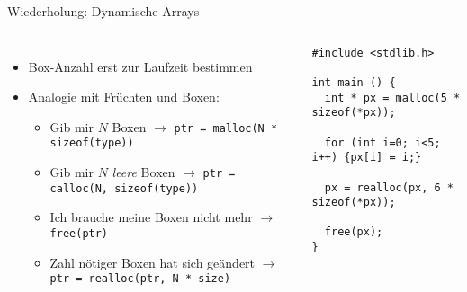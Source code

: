 \begin{frame}[fragile]{Wiederholung: Dynamische Arrays}
%
\begin{columns}[T]
\begin{itemize}
\item Box-Anzahl erst zur Laufzeit bestimmen
\item Analogie mit Früchten und Boxen:
	\begin{itemize}
	\item Gib mir $N$ Boxen \newline 
		$\rightarrow$ \footnotesize \texttt{ptr = malloc(N * sizeof(type))}
	\item \small Gib mir $N$ \emph{leere} Boxen \newline 
		$\rightarrow$ \footnotesize \texttt{ptr = calloc(N, sizeof(type))}
	\item \small Ich brauche meine Boxen nicht mehr \newline
		$\rightarrow$ \footnotesize \texttt{free(ptr)}
	\item \small Zahl nötiger Boxen hat sich geändert \newline
		$\rightarrow$ \footnotesize \texttt{ptr = realloc(ptr, N * size)}
	\end{itemize}
\end{itemize}
%
\begin{codebox}
\begin{verbatim}
#include <stdlib.h>

int main () {
  int * px = malloc(5 * sizeof(*px));

  for (int i=0; i<5; i++) {px[i] = i;}

  px = realloc(px, 6 * sizeof(*px));

  free(px);
}
\end{verbatim}
\end{codebox}
\end{columns}
%
\end{frame}


